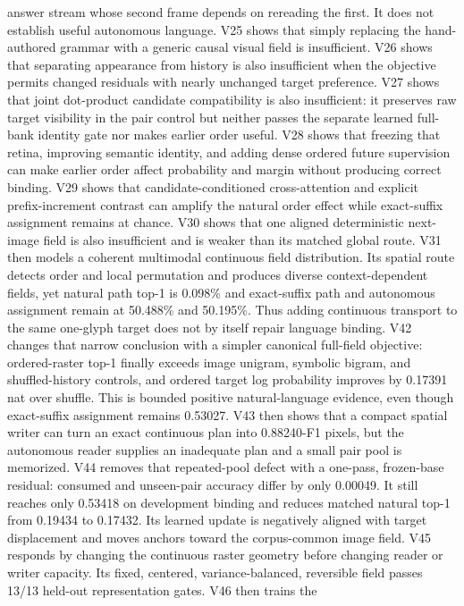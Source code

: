 \documentclass[11pt]{article}
\begin{document}
answer stream whose second frame depends on rereading the first. It does not
establish useful autonomous language. V25 shows that simply replacing the
hand-authored grammar with a generic causal visual field is insufficient. V26
shows that separating appearance from history is also insufficient when the
objective permits changed residuals with nearly unchanged target preference.
V27 shows that joint dot-product candidate compatibility is also insufficient:
it preserves raw target visibility in the pair control but neither passes the
separate learned full-bank identity gate nor makes earlier order useful. V28
shows that freezing that retina, improving semantic identity, and adding dense
ordered future supervision can make earlier order affect probability and
margin without producing correct binding. V29 shows that candidate-conditioned
cross-attention and explicit prefix-increment contrast can amplify the natural
order effect while exact-suffix assignment remains at chance. V30 shows that
one aligned deterministic next-image field is also insufficient and is weaker
than its matched global route. V31 then models a coherent multimodal continuous
field distribution. Its spatial route detects order and local permutation and
produces diverse context-dependent fields, yet natural path top-1 is 0.098\%
and exact-suffix path and autonomous assignment remain at 50.488\% and 50.195\%.
Thus adding continuous transport to the same one-glyph target does not by itself
repair language binding. V42 changes that narrow conclusion with a simpler
canonical full-field objective: ordered-raster top-1 finally exceeds image
unigram, symbolic bigram, and shuffled-history controls, and ordered target log
probability improves by 0.17391 nat over shuffle. This is bounded positive
natural-language evidence, even though exact-suffix assignment remains 0.53027.
V43 then shows that a compact spatial writer can turn an exact continuous plan
into 0.88240-F1 pixels, but the autonomous reader supplies an inadequate plan
and a small pair pool is memorized. V44 removes that repeated-pool defect with a
one-pass, frozen-base residual: consumed and unseen-pair accuracy differ by only
0.00049. It still reaches only 0.53418 on development binding and reduces
matched natural top-1 from 0.19434 to 0.17432. Its learned update is negatively
aligned with target displacement and moves anchors toward the corpus-common
image field. V45 responds by changing the continuous raster geometry before
changing reader or writer capacity. Its fixed, centered, variance-balanced,
reversible field passes 13/13 held-out representation gates. V46 then trains the
\end{document}
